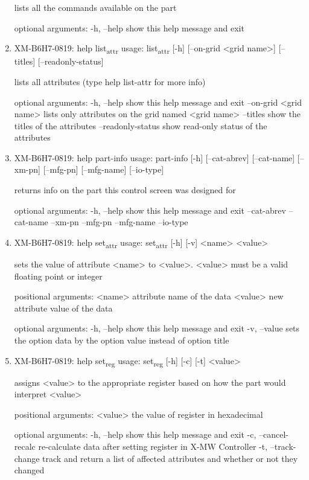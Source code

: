 \documentclass[11pt]{article}
\begin{document}
\begin{enumerate}
lists all the commands available on the part

optional arguments:
  -h, --help  show this help message and exit

\item XM-B6H7-0819: help list\textsubscript{attr}
\label{sec:org59d5bd7}
usage: list\textsubscript{attr} [-h] [--on-grid <grid name>] [--titles] [--readonly-status]

lists all attributes (type help list-attr for more info)

optional arguments:
  -h, --help            show this help message and exit
  --on-grid <grid name>
                        lists only attributes on the grid named <grid name>
  --titles              show the titles of the attributes
  --readonly-status     show read-only status of the attributes

\item XM-B6H7-0819: help part-info
\label{sec:org255b78d}
usage: part-info  [-h] [--cat-abrev] [--cat-name] [--xm-pn] [--mfg-pn] [--mfg-name]
        [--io-type]

returns info on the part this control screen was designed for

optional arguments:
  -h, --help   show this help message and exit
  --cat-abrev
  --cat-name
  --xm-pn
  --mfg-pn
  --mfg-name
  --io-type

\item XM-B6H7-0819: help set\textsubscript{attr}
\label{sec:orge9c5735}
usage: set\textsubscript{attr} [-h] [-v] <name> <value>

sets the value of attribute <name> to <value>. <value> must be a valid
floating point or integer

positional arguments:
  <name>       attribute name of the data
  <value>      new attribute value of the data

optional arguments:
  -h, --help   show this help message and exit
  -v, --value  sets the option data by the option value instead of option
               title

\item XM-B6H7-0819: help set\textsubscript{reg}
\label{sec:org07f28b8}
usage: set\textsubscript{reg} [-h] [-c] [-t] <value>

assigns <value> to the appropriate register based on how the part would
interpret <value>

positional arguments:
  <value>              the value of register in hexadecimal

optional arguments:
  -h, --help           show this help message and exit
  -c, --cancel-recalc  re-calculate data after setting register in X-MW
                       Controller
  -t, --track-change   track and return a list of affected attributes and
                       whether or not they changed


\end{enumerate}
\end{document}
